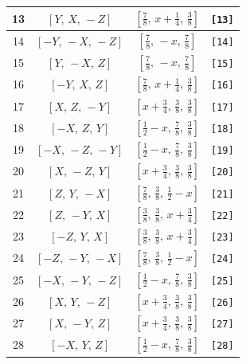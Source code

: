 \documentclass[fleqn,8pt]{jsarticle}
\begin{document}
\begin{longtable}{cccc}
13 & $\left[ Y,\, X,\, - Z \right]$ & $\left[ \frac{7}{8},\, x + \frac{1}{4},\, \frac{3}{8} \right]$ & {\tt [13]} \\ \hline
14 & $\left[ - Y,\, - X,\, - Z \right]$ & $\left[ \frac{7}{8},\, - x,\, \frac{7}{8} \right]$ & {\tt [14]} \\ \hline
15 & $\left[ Y,\, - X,\, Z \right]$ & $\left[ \frac{7}{8},\, - x,\, \frac{7}{8} \right]$ & {\tt [15]} \\ \hline
16 & $\left[ - Y,\, X,\, Z \right]$ & $\left[ \frac{7}{8},\, x + \frac{1}{4},\, \frac{3}{8} \right]$ & {\tt [16]} \\ \hline
17 & $\left[ X,\, Z,\, - Y \right]$ & $\left[ x + \frac{3}{4},\, \frac{3}{8},\, \frac{3}{8} \right]$ & {\tt [17]} \\ \hline
18 & $\left[ - X,\, Z,\, Y \right]$ & $\left[ \frac{1}{2} - x,\, \frac{7}{8},\, \frac{3}{8} \right]$ & {\tt [18]} \\ \hline
19 & $\left[ - X,\, - Z,\, - Y \right]$ & $\left[ \frac{1}{2} - x,\, \frac{7}{8},\, \frac{3}{8} \right]$ & {\tt [19]} \\ \hline
20 & $\left[ X,\, - Z,\, Y \right]$ & $\left[ x + \frac{3}{4},\, \frac{3}{8},\, \frac{3}{8} \right]$ & {\tt [20]} \\ \hline
21 & $\left[ Z,\, Y,\, - X \right]$ & $\left[ \frac{7}{8},\, \frac{3}{8},\, \frac{1}{2} - x \right]$ & {\tt [21]} \\ \hline
22 & $\left[ Z,\, - Y,\, X \right]$ & $\left[ \frac{3}{8},\, \frac{3}{8},\, x + \frac{3}{4} \right]$ & {\tt [22]} \\ \hline
23 & $\left[ - Z,\, Y,\, X \right]$ & $\left[ \frac{3}{8},\, \frac{3}{8},\, x + \frac{3}{4} \right]$ & {\tt [23]} \\ \hline
24 & $\left[ - Z,\, - Y,\, - X \right]$ & $\left[ \frac{7}{8},\, \frac{3}{8},\, \frac{1}{2} - x \right]$ & {\tt [24]} \\ \hline
25 & $\left[ - X,\, - Y,\, - Z \right]$ & $\left[ \frac{1}{2} - x,\, \frac{7}{8},\, \frac{3}{8} \right]$ & {\tt [25]} \\ \hline
26 & $\left[ X,\, Y,\, - Z \right]$ & $\left[ x + \frac{3}{4},\, \frac{3}{8},\, \frac{3}{8} \right]$ & {\tt [26]} \\ \hline
27 & $\left[ X,\, - Y,\, Z \right]$ & $\left[ x + \frac{3}{4},\, \frac{3}{8},\, \frac{3}{8} \right]$ & {\tt [27]} \\ \hline
28 & $\left[ - X,\, Y,\, Z \right]$ & $\left[ \frac{1}{2} - x,\, \frac{7}{8},\, \frac{3}{8} \right]$ & {\tt [28]} \\ \hline

\end{longtable}
\end{document}
